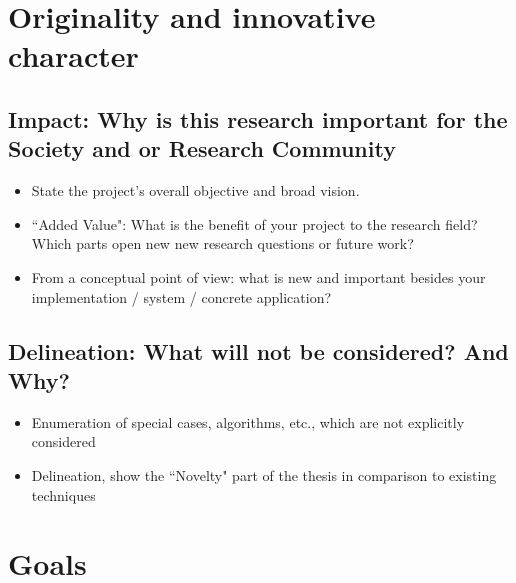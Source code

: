 \documentclass[11pt,a4paper]{article}
\begin{document}
\section{Originality and innovative character}

\subsection{Impact: Why is this research important for the Society and or Research Community}

\begin{itemize}
\item State the project's overall objective and broad vision.  
\item ``Added Value": What is the benefit of your project to the research field? Which parts open new new research questions or future work?
\item From a conceptual point of view: what is new and important besides your implementation / system / concrete application?
\end{itemize}

\subsection{Delineation: What will not be considered? And Why?}

\begin{itemize}
\item Enumeration of special cases, algorithms, etc., which are not explicitly considered
\item Delineation, show the ``Novelty" part of the thesis in comparison to existing techniques 
\end{itemize}


\section{Goals}
\end{document}
